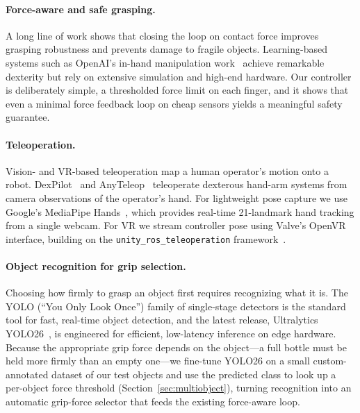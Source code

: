 \documentclass[acmlarge,screen,nonacm]{acmart}
\begin{document}
\paragraph{Force-aware and safe grasping.}
A long line of work shows that closing the loop on contact force improves
grasping robustness and prevents damage to fragile objects. Learning-based
systems such as OpenAI's in-hand manipulation
work~\cite{andrychowicz2020dexterity} achieve remarkable dexterity but rely on
extensive simulation and high-end hardware. Our controller is deliberately
simple, a thresholded force limit on each finger, and it shows that even a
minimal force feedback loop on cheap sensors yields a meaningful safety
guarantee.

\paragraph{Teleoperation.}
Vision- and VR-based teleoperation map a human operator's motion onto a robot.
DexPilot~\cite{handa2020dexpilot} and AnyTeleop~\cite{qin2023anyteleop}
teleoperate dexterous hand-arm systems from camera observations of the
operator's hand. For lightweight pose capture we use Google's MediaPipe
Hands~\cite{zhang2020mediapipe}, which provides real-time 21-landmark hand
tracking from a single webcam. For VR we stream controller pose using Valve's
OpenVR~\cite{valve2024openvr} interface, building on the
\texttt{unity\_ros\_teleoperation} framework~\cite{leggedrobotics_teleop}.

\paragraph{Object recognition for grip selection.}
Choosing how firmly to grasp an object first requires recognizing what it is.
The YOLO (``You Only Look Once'') family of single-stage detectors is the
standard tool for fast, real-time object detection, and the latest release,
Ultralytics YOLO26~\cite{ultralytics_yolo26}, is engineered for efficient,
low-latency inference on edge hardware. Because the appropriate grip force
depends on the object---a full bottle must be held more firmly than an empty
one---we fine-tune YOLO26 on a small custom-annotated dataset of our test
objects and use the predicted class to look up a per-object force threshold
(Section~\ref{sec:multiobject}), turning recognition into an automatic
grip-force selector that feeds the existing force-aware loop.
\end{document}

